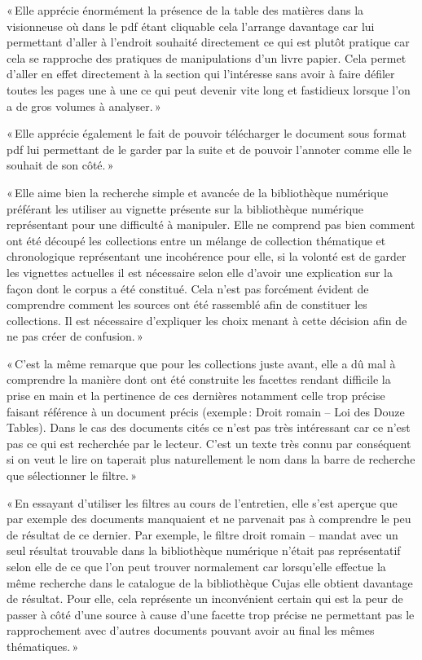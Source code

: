 « Elle apprécie énormément la présence de la table des matières dans la visionneuse où dans le pdf étant cliquable cela l’arrange davantage car lui permettant d’aller à l’endroit souhaité directement ce qui est plutôt pratique car cela se rapproche des pratiques de manipulations d’un livre papier. Cela permet d’aller en effet directement à la section qui l’intéresse sans avoir à faire défiler toutes les pages une à une ce qui peut devenir vite long et fastidieux lorsque l’on a de gros volumes à analyser. » 

« Elle apprécie également le fait de pouvoir télécharger le document sous format pdf lui permettant de le garder par la suite et de pouvoir l’annoter comme elle le souhait de son côté. » 

« Elle aime bien la recherche simple et avancée de la bibliothèque numérique préférant les utiliser au vignette présente sur la bibliothèque numérique représentant pour une difficulté à manipuler. Elle ne comprend pas bien comment ont été découpé les collections entre un mélange de collection thématique et chronologique représentant une incohérence pour elle, si la volonté est de garder les vignettes actuelles il est nécessaire selon elle d’avoir une explication sur la façon dont le corpus a été constitué. Cela n’est pas forcément évident de comprendre comment les sources ont été rassemblé afin de constituer les collections. Il est nécessaire d’expliquer les choix menant à cette décision afin de ne pas créer de confusion. » 

« C’est la même remarque que pour les collections juste avant, elle a dû mal à comprendre la manière dont ont été construite les facettes rendant difficile la prise en main et la pertinence de ces dernières notamment celle trop précise faisant référence à un document précis (exemple : Droit romain – Loi des Douze Tables). Dans le cas des documents cités ce n’est pas très intéressant car ce n’est pas ce qui est recherchée par le lecteur. C’est un texte très connu par conséquent si on veut le lire on taperait plus naturellement le nom dans la barre de recherche que sélectionner le filtre. » 

« En essayant d’utiliser les filtres au cours de l’entretien, elle s’est aperçue que par exemple des documents manquaient et ne parvenait pas à comprendre le peu de résultat de ce dernier. Par exemple, le filtre droit romain – mandat avec un seul résultat trouvable dans la bibliothèque numérique n’était pas représentatif selon elle de ce que l’on peut trouver normalement car lorsqu’elle effectue la même recherche dans le catalogue de la bibliothèque Cujas elle obtient davantage de résultat. Pour elle, cela représente un inconvénient certain qui est la peur de passer à côté d’une source à cause d’une facette trop précise ne permettant pas le rapprochement avec d’autres documents pouvant avoir au final les mêmes thématiques. » 

